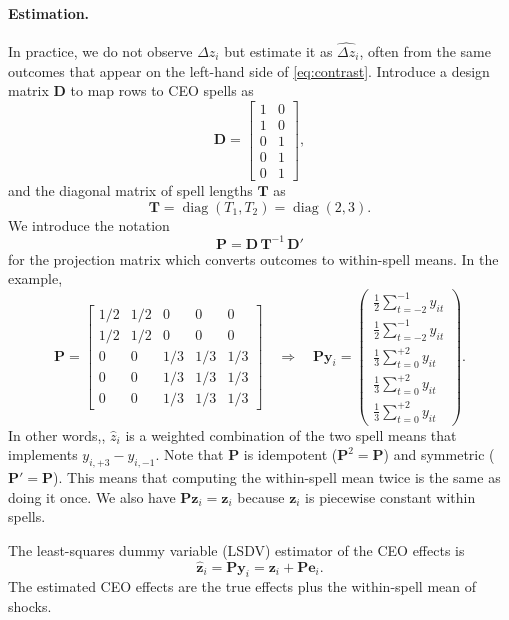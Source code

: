 \documentclass[11pt,a4paper]{article}
\begin{document}
\paragraph{Estimation.} In practice, we do not observe $\Delta z_i$ but estimate it as $\hat{\Delta z}_i$, often from the same outcomes that appear on the left-hand side of \eqref{eq:contrast}. Introduce a design matrix $\mathbf D$ to map rows to CEO spells as
\[
  \mathbf D = \begin{bmatrix}
    1 & 0\\
    1 & 0\\
    0 & 1\\
    0 & 1\\
    0 & 1
  \end{bmatrix},
\]
and the diagonal matrix of spell lengths $\mathbf T$ as
$$
  \mathbf T = \operatorname{diag}(T_1,T_2)=\operatorname{diag}(2,3).
$$
We introduce the notation
$$
  \mathbf P = \mathbf D\,\mathbf T^{-1}\,\mathbf D'
$$
for the projection matrix which converts outcomes to within-spell means. In the example,
\[
  \mathbf P = \begin{bmatrix}
    1/2 & 1/2 & 0 & 0 & 0\\
    1/2 & 1/2 & 0 & 0 & 0\\
    0 & 0 & 1/3 & 1/3 & 1/3\\
    0 & 0 & 1/3 & 1/3 & 1/3\\
    0 & 0 & 1/3 & 1/3 & 1/3
  \end{bmatrix}\quad\Rightarrow\quad
  \mathbf {Py}_i = 
  \begin{pmatrix}
  \frac12 \sum_{t=-2}^{-1} y_{it} \\
  \frac12 \sum_{t=-2}^{-1} y_{it} \\
  \frac13 \sum_{t=0}^{+2} y_{it}\\
  \frac13 \sum_{t=0}^{+2} y_{it}\\
  \frac13 \sum_{t=0}^{+2} y_{it}
  \end{pmatrix}.
\]
In other words,, $\hat z_i$ is a weighted combination of the two spell means that implements $y_{i,+3}-y_{i,-1}$. Note that $\mathbf P$ is idempotent ($\mathbf P^2=\mathbf P$) and symmetric ($\mathbf P'=\mathbf P$). This means that computing the within-spell mean twice is the same as doing it once. We also have $\mathbf P\mathbf z_i = \mathbf z_i$ because $\mathbf z_i$ is piecewise constant within spells.

The least-squares dummy variable (LSDV) estimator of the CEO effects is
\begin{equation}\label{eq:lsdv}
  \hat{\mathbf z}_i = \mathbf P\mathbf y_i = \mathbf z_i + \mathbf P\mathbf e_i.
\end{equation}  
The estimated CEO effects are the true effects plus the within-spell mean of shocks.
\end{document}
